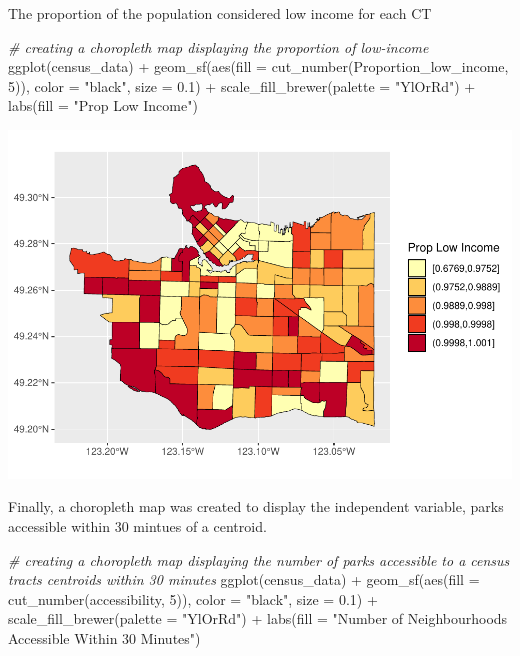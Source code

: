\documentclass[
]{article}
\newenvironment{Shaded}{\begin{snugshade}}{\end{snugshade}}
\newcommand{\AttributeTok}[1]{\textcolor[rgb]{0.77,0.63,0.00}{#1}}
\newcommand{\CommentTok}[1]{\textcolor[rgb]{0.56,0.35,0.01}{\textit{#1}}}
\newcommand{\DecValTok}[1]{\textcolor[rgb]{0.00,0.00,0.81}{#1}}
\newcommand{\FloatTok}[1]{\textcolor[rgb]{0.00,0.00,0.81}{#1}}
\newcommand{\FunctionTok}[1]{\textcolor[rgb]{0.00,0.00,0.00}{#1}}
\newcommand{\NormalTok}[1]{#1}
\newcommand{\SpecialCharTok}[1]{\textcolor[rgb]{0.00,0.00,0.00}{#1}}
\newcommand{\StringTok}[1]{\textcolor[rgb]{0.31,0.60,0.02}{#1}}
\begin{document}
The proportion of the population considered low income for each CT

\begin{Shaded}
\begin{Highlighting}[]
\CommentTok{\# creating a choropleth map displaying the proportion of low{-}income }
\FunctionTok{ggplot}\NormalTok{(census\_data) }\SpecialCharTok{+}
\FunctionTok{geom\_sf}\NormalTok{(}\FunctionTok{aes}\NormalTok{(}\AttributeTok{fill =} \FunctionTok{cut\_number}\NormalTok{(Proportion\_low\_income, }\DecValTok{5}\NormalTok{)),}
        \AttributeTok{color =} \StringTok{"black"}\NormalTok{,}
        \AttributeTok{size =} \FloatTok{0.1}\NormalTok{) }\SpecialCharTok{+}
\FunctionTok{scale\_fill\_brewer}\NormalTok{(}\AttributeTok{palette =} \StringTok{"YlOrRd"}\NormalTok{) }\SpecialCharTok{+}
\FunctionTok{labs}\NormalTok{(}\AttributeTok{fill =} \StringTok{"Prop Low Income"}\NormalTok{)}
\end{Highlighting}
\end{Shaded}

\includegraphics{4GA3Markdown_files/figure-latex/unnamed-chunk-26-1.pdf}

Finally, a choropleth map was created to display the independent
variable, parks accessible within 30 mintues of a centroid.

\begin{Shaded}
\begin{Highlighting}[]
\CommentTok{\# creating a choropleth map displaying the number of parks accessible to a census tract\textquotesingle{}s centroids within 30 minutes}
\FunctionTok{ggplot}\NormalTok{(census\_data) }\SpecialCharTok{+}
\FunctionTok{geom\_sf}\NormalTok{(}\FunctionTok{aes}\NormalTok{(}\AttributeTok{fill =} \FunctionTok{cut\_number}\NormalTok{(accessibility, }\DecValTok{5}\NormalTok{)),}
        \AttributeTok{color =} \StringTok{"black"}\NormalTok{,}
        \AttributeTok{size =} \FloatTok{0.1}\NormalTok{) }\SpecialCharTok{+}
\FunctionTok{scale\_fill\_brewer}\NormalTok{(}\AttributeTok{palette =} \StringTok{"YlOrRd"}\NormalTok{) }\SpecialCharTok{+}
\FunctionTok{labs}\NormalTok{(}\AttributeTok{fill =} \StringTok{"Number of Neighbourhoods Accessible Within 30 Minutes"}\NormalTok{)}
\end{Highlighting}
\end{Shaded}
\end{document}
